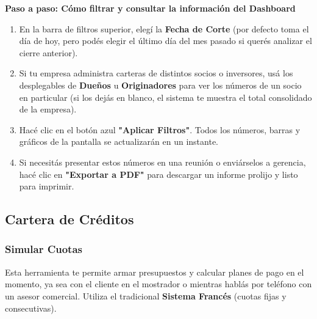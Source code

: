 \documentclass[12pt,a4paper]{article}
\renewcommand{\_}{\textunderscore\allowbreak}
\begin{document}
\textbf{Paso a paso: Cómo filtrar y consultar la información del Dashboard}
\begin{enumerate}
    \item En la barra de filtros superior, elegí la \textbf{Fecha de Corte} (por defecto toma el día de hoy, pero podés elegir el último día del mes pasado si querés analizar el cierre anterior).
    \item Si tu empresa administra carteras de distintos socios o inversores, usá los desplegables de \textbf{Dueños} u \textbf{Originadores} para ver los números de un socio en particular (si los dejás en blanco, el sistema te muestra el total consolidado de la empresa).
    \item Hacé clic en el botón azul \textbf{"Aplicar Filtros"}. Todos los números, barras y gráficos de la pantalla se actualizarán en un instante.
    \item Si necesitás presentar estos números en una reunión o enviárselos a gerencia, hacé clic en \textbf{"Exportar a PDF"} para descargar un informe prolijo y listo para imprimir.
\end{enumerate}

\subsection{Cartera de Créditos}

\subsubsection{Simular Cuotas}
Esta herramienta te permite armar presupuestos y calcular planes de pago en el momento, ya sea con el cliente en el mostrador o mientras hablás por teléfono con un asesor comercial. Utiliza el tradicional \textbf{Sistema Francés} (cuotas fijas y consecutivas).
\end{document}
